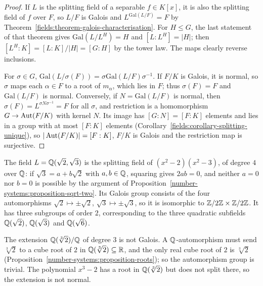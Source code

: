 \begin{proof}
If $L$ is the splitting field of a separable $f \in K[x]$, it is also the splitting field of
$f$ over $F$, so $L/F$ is Galois and $L^{\mathrm{Gal}(L/F)} = F$ by
Theorem~\ref{fields:theorem-galois-characterisation}. For $H \leq G$, the last statement of
that theorem gives $\mathrm{Gal}(L/L^H) = H$ and $[L : L^H] = |H|$; then
$[L^H : K] = [L : K]/|H| = [G : H]$ by the tower law. The maps clearly reverse inclusions.

For $\sigma \in G$, $\mathrm{Gal}(L/\sigma(F)) = \sigma\mathrm{Gal}(L/F)\sigma^{-1}$. If $F/K$ is Galois, it is
normal, so $\sigma$ maps each $\alpha \in F$ to a root of $m_\alpha$, which lies in $F$; thus
$\sigma(F) = F$ and $\mathrm{Gal}(L/F)$ is normal. Conversely, if $N = \mathrm{Gal}(L/F)$ is normal, then
$\sigma(F) = L^{\sigma N \sigma^{-1}} = F$ for all $\sigma$, and restriction is a homomorphism
$G \to \operatorname{Aut}(F/K)$ with kernel $N$. Its image has $[G : N] = [F : K]$ elements and lies in a
group with at most $[F : K]$ elements (Corollary~\ref{fields:corollary-splitting-unique}), so
$|\operatorname{Aut}(F/K)| = [F : K]$, $F/K$ is Galois and the restriction map is surjective.
\end{proof}

\begin{example}\label{fields:example-biquadratic}
The field $L = \mathbb{Q}(\sqrt 2, \sqrt 3)$ is the splitting field of $(x^2 - 2)(x^2 - 3)$, of degree $4$
over $\mathbb{Q}$: if $\sqrt 3 = a + b\sqrt 2$ with $a, b \in \mathbb{Q}$, squaring gives $2ab = 0$, and neither
$a = 0$ nor $b = 0$ is possible by the argument of
Proposition~\ref{number-systems:proposition-sqrt-two}. Its Galois group consists of the four
automorphisms $\sqrt 2 \mapsto \pm\sqrt 2$, $\sqrt 3 \mapsto \pm\sqrt 3$, so it is isomorphic to
$\mathbb{Z}/2\mathbb{Z} \times \mathbb{Z}/2\mathbb{Z}$. It has three subgroups of order $2$, corresponding to the three
quadratic subfields $\mathbb{Q}(\sqrt 2)$, $\mathbb{Q}(\sqrt 3)$ and $\mathbb{Q}(\sqrt 6)$.
\end{example}

\begin{counterexample}\label{fields:counterexample-not-galois}
The extension $\mathbb{Q}(\sqrt[3]{2})/\mathbb{Q}$ of degree $3$ is not Galois. A $\mathbb{Q}$-automorphism must send
$\sqrt[3]{2}$ to a cube root of $2$ in $\mathbb{Q}(\sqrt[3]{2}) \subseteq \mathbb{R}$, and the only real cube root of
$2$ is $\sqrt[3]{2}$ (Proposition~\ref{number-systems:proposition-roots}); so the automorphism
group is trivial. The polynomial $x^3 - 2$ has a root in $\mathbb{Q}(\sqrt[3]{2})$ but does not split
there, so the extension is not normal.
\end{counterexample}

